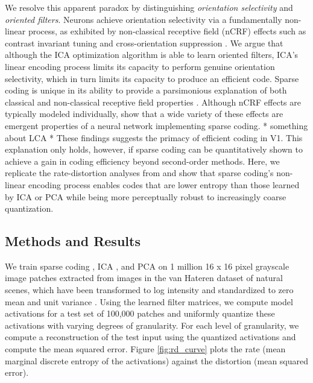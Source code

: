 We resolve this apparent paradox by distinguishing \textit{orientation selectivity} and \textit{oriented filters}. Neurons achieve orientation selectivity via a fundamentally non-linear process, as exhibited by non-classical receptive field (nCRF) effects such as contrast invariant tuning and cross-orientation suppression \cite{ferster2000natural,  zhu2013visual}. We argue that although the ICA optimization algorithm is able to learn oriented filters, ICA's linear encoding process limits its capacity to perform genuine orientation selectivity, which in turn limits its capacity to produce an efficient code. Sparse coding is unique in its ability to provide a parsimonious explanation of both classical and non-classical receptive field properties \cite{zhu2013visual, golden2016conjectures}. Although nCRF effects are typically modeled individually,  show that a wide variety of these effects are emergent properties of a neural network implementing sparse coding. * something about LCA * These findings suggests the primacy of efficient coding in V1. This explanation only holds, however, if sparse coding can be quantitatively shown to achieve a gain in coding efficiency beyond second-order methods. Here, we replicate the rate-distortion analyses from  and show that sparse coding's non-linear encoding process enables codes that are lower entropy than those learned by ICA or PCA while being more perceptually robust to increasingly coarse quantization.


\subsection{Methods and Results}
We train sparse coding \cite{rozell2008sparse}, ICA \cite{bell1997independent}, and PCA on 1 million 16 x 16 pixel grayscale image patches extracted from images in the van Hateren dataset of natural scenes, which have been transformed to log intensity and standardized to zero mean and unit variance \cite{vanHateren1998independent}. Using the learned filter matrices, we compute model activations for a test set of 100,000 patches and uniformly quantize these activations with varying degrees of granularity. For each level of granularity, we compute a reconstruction of the test input using the quantized activations and compute the mean squared error. Figure \ref{fig:rd_curve} plots the rate (mean marginal discrete entropy of the activations) against the distortion (mean squared error).


